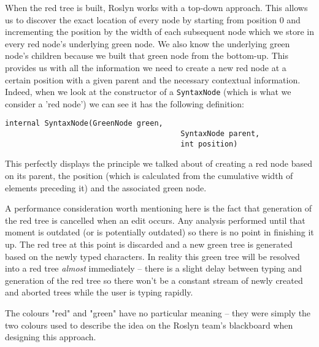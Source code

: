 \medskip

When the red tree is built, Roslyn works with a top-down approach. This allows us to discover the exact location of every node by starting from position 0 and incrementing the position by the width of each subsequent node which we store in every red node's underlying green node. We also know the underlying green node's children because we built that green node from the bottom-up. This provides us with all the information we need to create a new red node at a certain position with a given parent and the necessary contextual information. Indeed, when we look at the constructor of a \texttt{SyntaxNode} (which is what we consider a 'red node') we can see it has the following definition:

\begin{lstlisting}
internal SyntaxNode(GreenNode green, 
										SyntaxNode parent, 
										int position)
\end{lstlisting}

This perfectly displays the principle we talked about of creating a red node based on its parent, the position (which is calculated from the cumulative width of elements preceding it) and the associated green node.

\medskip

A performance consideration worth mentioning here is the fact that generation of the red tree is cancelled when an edit occurs. Any analysis performed until that moment is outdated (or is potentially outdated) so there is no point in finishing it up. The red tree at this point is discarded and a new green tree is generated based on the newly typed characters. In reality this green tree will be resolved into a red tree \textit{almost} immediately -- there is a slight delay between typing and generation of the red tree so there won't be a constant stream of newly created and aborted trees while the user is typing rapidly.

The colours "red" and "green" have no particular meaning -- they were simply the two colours used to describe the idea on the Roslyn team's blackboard when designing this approach.\parencite{Lippert2012}

